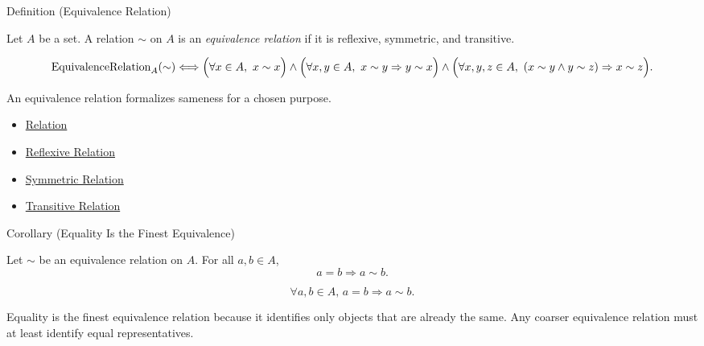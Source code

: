 \begin{definitionbox}{Definition (Equivalence Relation)}
\begin{definition}
\label{def:equivalence-relation}
Let $A$ be a set. A relation $\sim$ on $A$ is an \emph{equivalence relation}
if it is reflexive, symmetric, and transitive.
\end{definition}

\begin{remark*}
\[
\operatorname{EquivalenceRelation}_A(\sim)
\Longleftrightarrow
\Bigl(\forall x\in A,\ x\sim x\Bigr)
\land
\Bigl(\forall x,y\in A,\ x\sim y \Rightarrow y\sim x\Bigr)
\land
\Bigl(\forall x,y,z\in A,\ (x\sim y\land y\sim z)\Rightarrow x\sim z\Bigr).
\]
\end{remark*}

\begin{remark*}[Interpretation]
An equivalence relation formalizes sameness for a chosen purpose.
\end{remark*}

\begin{dependencies}
\begin{itemize}
  \item \hyperref[def:relation]{Relation}
  \item \hyperref[def:reflexive]{Reflexive Relation}
  \item \hyperref[def:symmetric]{Symmetric Relation}
  \item \hyperref[def:transitive]{Transitive Relation}
\end{itemize}
\end{dependencies}
\end{definitionbox}

\begin{corollarybox}{Corollary (Equality Is the Finest Equivalence)}
\begin{corollary}
\label{cor:equality-is-finest-equivalence}
Let $\sim$ be an equivalence relation on $A$. For all $a,b\in A$,
\[
a=b \Longrightarrow a\sim b.
\]
\end{corollary}
\end{corollarybox}

\begin{remark*}
\[
\forall a,b\in A,\,
a=b\Longrightarrow a\sim b.
\]
\end{remark*}

\begin{remark*}[Interpretation]
Equality is the finest equivalence relation because it identifies only objects
that are already the same. Any coarser equivalence relation must at least
identify equal representatives.
\end{remark*}

